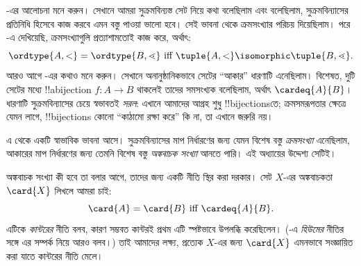 \documentclass[../../../include/open-logic-section]{subfiles}
\begin{document}

-এর আলোচনা মনে করুন। সেখানে আমরা
সুক্রমবিন্যস্ত সেট নিয়ে কথা বলেছিলাম এবং বলেছিলাম, সুক্রমবিন্যাসের
প্রতিনিধি হিসেবে কাজ করবে এমন বস্তু পাওয়া ভালো হবে। সেই ভাবনা
থেকে ক্রমসংখ্যার পরিচয় দিয়েছিলাম। পরে
-এ দেখিয়েছি,
ক্রমসংখ্যাগুলি প্রত্যাশামতোই কাজ করে, অর্থাৎ:
\[
	\ordtype{A, <} = \ordtype{B, \lessdot}
	\text{ iff } \tuple{A, <} \isomorphic \tuple{B, \lessdot}.
\]
আরও আগে -এর কথাও মনে করুন। সেখানে
অনানুষ্ঠানিকভাবে সেটের ``আকার'' ধারণাটি এনেছিলাম। বিশেষত,
দুটি সেটের মধ্যে !!a{bijection} $f\colon A\to B$ থাকলেই
তাদের সমসংখ্যক বলেছিলাম, অর্থাৎ $\cardeq{A}{B}$। ধারণাটি
সুক্রমবিন্যাসের চেয়ে স্বভাবতই \emph{সরল}: এখানে আমাদের আগ্রহ
শুধু !!{bijection}sতে; ক্রমসমরূপতার ক্ষেত্রে যেমন লাগে,
!!{bijection}s কোনো ``কাঠামো রক্ষা করে'' কি না, তা এখানে জরুরি নয়।

এ থেকে একটি স্বাভাবিক ভাবনা আসে। সুক্রমবিন্যাসের মাপ নির্ধারণের
জন্য যেমন বিশেষ বস্তু \emph{ক্রমসংখ্যা} এনেছিলাম, আকারের মাপ
নির্ধারণের জন্য তেমনি বিশেষ বস্তু \emph{অঙ্কবাচক সংখ্যা} আনতে
পারি। এই অধ্যায়ের উদ্দেশ্য সেটিই।

অঙ্কবাচক সংখ্যা কী হবে তা বলার আগে, তাদের জন্য একটি নীতি
স্থির করা দরকার। সেট $X$-এর অঙ্কবাচকতা $\card{X}$ লিখলে আমরা চাই:
\[
	\card{A} = \card{B} \text{ iff } \cardeq{A}{B}.
\]
এটিকে \emph{কান্টরের} নীতি বলব, কারণ সম্ভবত কান্টরই প্রথম
এটি স্পষ্টভাবে উপলব্ধি করেছিলেন। (-এ
\emph{হিউমের} নীতির সঙ্গে এর সম্পর্ক নিয়ে আরও বলব।)
তাই আমাদের লক্ষ্য, প্রত্যেক $X$-এর জন্য $\card{X}$ এমনভাবে
সংজ্ঞায়িত করা যাতে কান্টরের নীতি মেলে।
\end{document}
